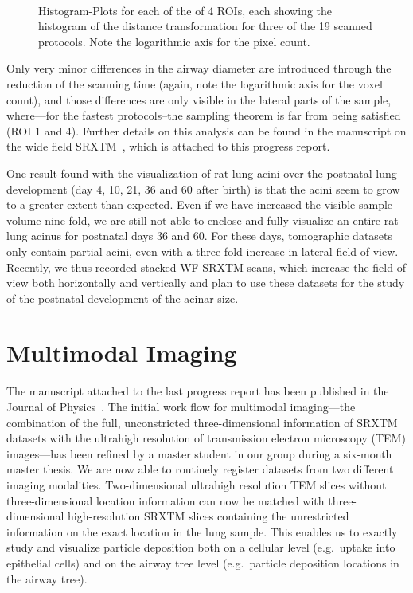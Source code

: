 \documentclass[a4paper,twoside,DIV=calc]{scrartcl}
\newif\ifhtml
\newcommand{\imsize}{\linewidth}
\begin{document}
\renewcommand{\imsize}{0.5\linewidth}
\begin{figure}[ht]
	\centering
	\ifhtml
	\else
		\\%
	\fi
	\caption{Histogram-Plots for each of the of 4 ROIs, each showing the histogram of the distance transformation for three of the 19 scanned protocols. Note the logarithmic axis for the pixel count.}%
	\label{fig:DTFplots}
\end{figure}

Only very minor differences in the airway diameter are introduced through the reduction of the scanning time (again, note the logarithmic axis for the voxel count), and those differences are only visible in the lateral parts of the sample, where---for the fastest protocols--the sampling theorem is far from being satisfied (ROI 1 and 4). Further details on this analysis can be found in the manuscript on the wide field SRXTM~\cite{Haberthuer2010}, which is attached to this progress report.

One result found with the visualization of rat lung acini over the postnatal lung development (day 4, 10, 21, 36 and 60 after birth) is that the acini seem to grow to a greater extent than expected. Even if we have increased the visible sample volume nine-fold, we are still not able to enclose and fully visualize an entire rat lung acinus for postnatal days 36 and 60. For these days, tomographic datasets only contain partial acini, even with a three-fold increase in lateral field of view. Recently, we thus recorded stacked WF-SRXTM scans, which increase the field of view both horizontally and vertically and plan to use these datasets for the study of the postnatal development of the acinar size.

\section{Multimodal Imaging}
The manuscript attached to the last progress report has been published in the Journal of Physics~\cite{Haberthuer2009}. The initial work flow for multimodal imaging---the combination of the full, unconstricted three-dimensional information of SRXTM datasets with the ultrahigh resolution of transmission electron microscopy (TEM) images---has been refined by a master student in our group during a six-month master thesis. We are now able to routinely register datasets from two different imaging modalities. Two-dimensional ultrahigh resolution TEM slices without three-dimensional location information can now be matched with three-dimensional high-resolution SRXTM slices containing the unrestricted information on the exact location in the lung sample. This enables us to exactly study and visualize particle deposition both on a cellular level (e.g.\, uptake into epithelial cells) and on the airway tree level (e.g.~particle deposition locations in the airway tree).
\end{document}
